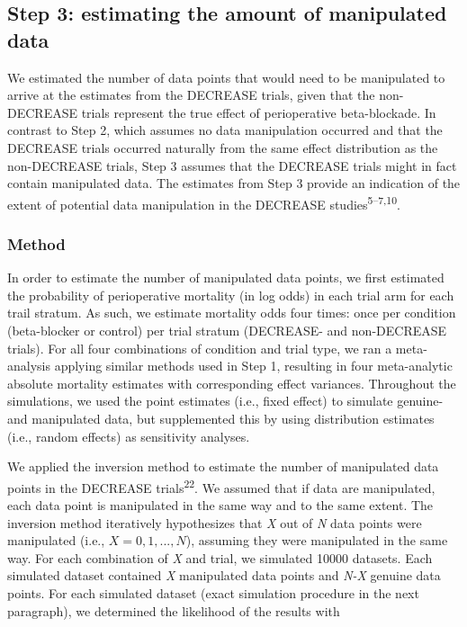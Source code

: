 \documentclass[]{article}
\begin{document}
\subsection{Step 3: estimating the amount of manipulated
data}\label{step-3-estimating-the-amount-of-manipulated-data}

We estimated the number of data points that would need to be manipulated
to arrive at the estimates from the DECREASE trials, given that the
non-DECREASE trials represent the true effect of perioperative
beta-blockade. In contrast to Step 2, which assumes no data manipulation
occurred and that the DECREASE trials occurred naturally from the same
effect distribution as the non-DECREASE trials, Step 3 assumes that the
DECREASE trials might in fact contain manipulated data. The estimates
from Step 3 provide an indication of the extent of potential data
manipulation in the DECREASE studies\textsuperscript{5--7,10}.

\subsubsection{Method}\label{method-1}

In order to estimate the number of manipulated data points, we first
estimated the probability of perioperative mortality (in log odds) in
each trial arm for each trail stratum. As such, we estimate mortality
odds four times: once per condition (beta-blocker or control) per trial
stratum (DECREASE- and non-DECREASE trials). For all four combinations
of condition and trial type, we ran a meta-analysis applying similar
methods used in Step 1, resulting in four meta-analytic absolute
mortality estimates with corresponding effect variances. Throughout the
simulations, we used the point estimates (i.e., fixed effect) to
simulate genuine- and manipulated data, but supplemented this by using
distribution estimates (i.e., random effects) as sensitivity analyses.

We applied the inversion method to estimate the number of manipulated
data points in the DECREASE trials\textsuperscript{22}. We assumed that
if data are manipulated, each data point is manipulated in the same way
and to the same extent. The inversion method iteratively hypothesizes
that \emph{X} out of \emph{N} data points were manipulated (i.e.,
\(X={0, 1, ..., N}\)), assuming they were manipulated in the same way.
For each combination of \emph{X} and trial, we simulated 10000 datasets.
Each simulated dataset contained \emph{X} manipulated data points and
\emph{N-X} genuine data points. For each simulated dataset (exact
simulation procedure in the next paragraph), we determined the
likelihood of the results with
\end{document}
